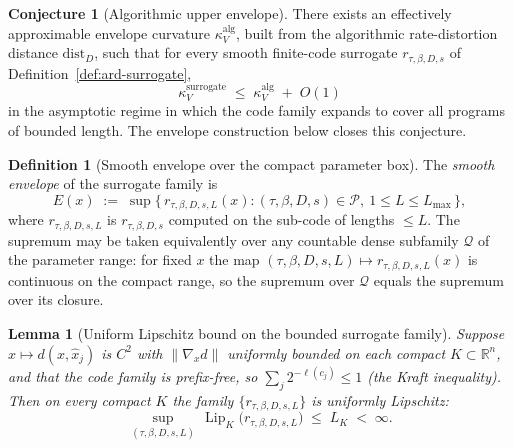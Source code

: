 \documentclass[11pt,a4paper]{article}
\theoremstyle{plain}
\newtheorem{lemma}[theorem]{Lemma}
\theoremstyle{definition}
\newtheorem{definition}[theorem]{Definition}
\newtheorem{conjecture}[theorem]{Conjecture}
\theoremstyle{remark}
\newcommand{\kk}{\kappa_{\!V}}
\newcommand{\RR}{\mathbb{R}}
\newcommand{\distD}{\mathrm{dist}_{D}}
\DeclareMathOperator{\Lip}{Lip}
\begin{document}
\begin{conjecture}[Algorithmic upper envelope]
\label{conj:alg-envelope}
There exists an effectively approximable envelope curvature
$\kk^{\mathrm{alg}}$, built from the algorithmic rate-distortion
distance $\distD$, such that for every smooth finite-code surrogate
$r_{\tau,\beta,D,s}$ of Definition~\ref{def:ard-surrogate},
\[
  \kk^{\mathrm{surrogate}} \;\leq\; \kk^{\mathrm{alg}} \;+\; O(1)
\]
in the asymptotic regime in which the code family expands to cover
all programs of bounded length. The envelope construction below
closes this conjecture.
\end{conjecture}

\begin{definition}[Smooth envelope over the compact parameter box]
\label{def:smooth-envelope}
The \emph{smooth envelope} of the surrogate family is
\begin{equation}\label{eq:smooth-envelope}
  E(x) \;:=\; \sup \bigl\{\, r_{\tau,\beta,D,s,L}(x) :
  (\tau, \beta, D, s) \in \mathcal{P},\ 1 \le L \le L_{\max}
  \,\bigr\},
\end{equation}
where $r_{\tau,\beta,D,s,L}$ is $r_{\tau,\beta,D,s}$ computed on the
sub-code of lengths $\le L$. The supremum may be taken equivalently
over any countable dense subfamily $\mathcal{Q}$ of the parameter
range: for fixed $x$ the map $(\tau,\beta,D,s,L) \mapsto
r_{\tau,\beta,D,s,L}(x)$ is continuous on the compact range, so the
supremum over $\mathcal{Q}$ equals the supremum over its closure.
\end{definition}

\begin{lemma}[Uniform Lipschitz bound on the bounded surrogate family]
\label{lem:uniform-lip}
Suppose $x \mapsto d(x, \hat x_j)$ is $C^2$ with $\|\nabla_x d\|$
uniformly bounded on each compact $K \subset \RR^n$, and that the
code family is prefix-free, so $\sum_j 2^{-\ell(c_j)} \le 1$ (the
Kraft inequality). Then on every compact $K$ the family
$\{r_{\tau,\beta,D,s,L}\}$ is uniformly Lipschitz:
\[
  \sup_{(\tau,\beta,D,s,L)}\, \Lip_K\!\bigl(
  r_{\tau,\beta,D,s,L}\bigr) \;\leq\; L_K \;<\; \infty.
\]
\end{lemma}
\end{document}

